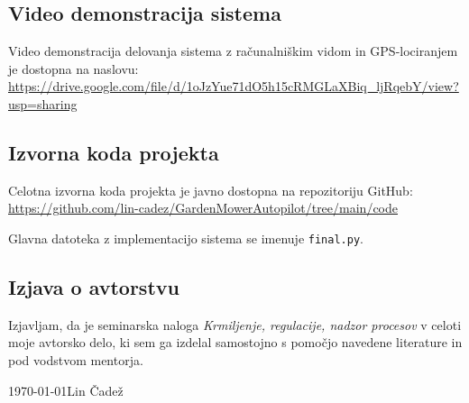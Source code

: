\documentclass[12pt]{article}
\begin{document}
\subsection{Video demonstracija sistema}

Video demonstracija delovanja sistema z računalniškim vidom in
GPS-lociranjem je dostopna na naslovu:
\url{https://drive.google.com/file/d/1oJzYue71dO5h15cRMGLaXBiq_ljRqebY/view?usp=sharing}


\subsection{Izvorna koda projekta}

Celotna izvorna koda projekta je javno dostopna na repozitoriju GitHub:
\url{https://github.com/lin-cadez/GardenMowerAutopilot/tree/main/code}


Glavna datoteka z implementacijo sistema se imenuje \texttt{final.py}.
\newpage
\begin{samepage}
\thispagestyle{empty}
\section*{Izjava o avtorstvu}
Izjavljam, da je seminarska naloga \textit{Krmiljenje, regulacije,
nadzor procesov} v celoti moje avtorsko delo, ki sem ga izdelal
samostojno s pomočjo navedene literature in pod vodstvom mentorja.

\vfill

\today \hfill Lin Čadež

\vspace{3cm}
\end{samepage}
\end{document}
